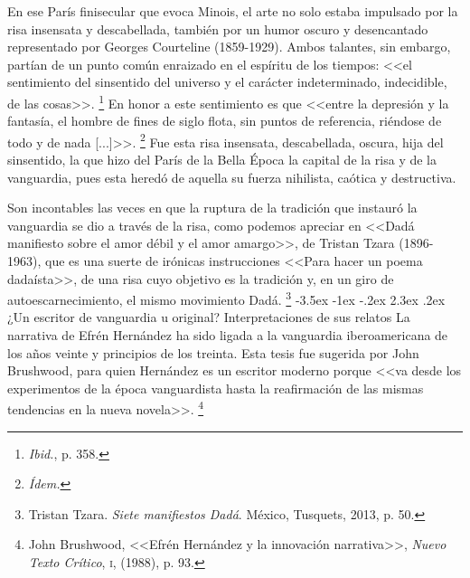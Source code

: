 \documentclass[14pt,twoside,final]{extbook} %
\makeatletter
\let\oldfootnote\footnote
\renewcommand\footnote[1]{%
\oldfootnote{\hspace{1mm}#1}}
\renewcommand\section{\@startsection {section}{1}{\z@}%
                                     {-3.5ex \@plus -1ex \@minus -.2ex}%
                                     {2.3ex \@plus .2ex}%
                                     {\normalfont\large\bfseries\sc}}
\makeatother
\begin{document}
En ese París finisecular que evoca Minois, el arte no solo estaba impulsado por la risa insensata y descabellada, también por un humor oscuro y desencantado representado por Georges Courteline (1859-1929). Ambos talantes, sin embargo, partían de un punto común enraizado en el espíritu de los tiempos: <<el sentimiento del sinsentido del universo y el carácter indeterminado, indecidible, de las cosas>>.\footnote{\emph{Ibid.}, p. 358.} En honor a este sentimiento es que <<entre la depresión y la fantasía, el hombre de fines de siglo flota, sin puntos de referencia, riéndose de todo y de nada [...]>>.\footnote{\emph{Ídem.}} Fue esta risa insensata, descabellada, oscura, hija del sinsentido, la que hizo del París de la Bella Época la capital de la risa y de la vanguardia, pues esta heredó de aquella su fuerza nihilista, caótica y destructiva.

Son incontables las veces en que la ruptura de la tradición que instauró la vanguardia se dio a través de la risa, como podemos apreciar en <<Dadá manifiesto sobre el amor débil y el amor amargo>>, de Tristan Tzara (\mbox{1896-1963}), que es una suerte de irónicas instrucciones <<Para hacer un poema dadaísta>>, de una risa cuyo objetivo es la tradición y, en un giro de autoescarnecimiento, el mismo movimiento Dadá.\footnote{Tristan Tzara. \emph{Siete manifiestos Dadá}. México, Tusquets, 2013, p. 50.}
\section{¿Un escritor de vanguardia u original? Interpretaciones de sus relatos}\label{sec:un-escritor-de-vanguardia-u-original-interprestaciones-de-sus-relatos}
La narrativa de Efrén Hernández ha sido ligada a la vanguardia iberoamericana de los años veinte y principios de los treinta. Esta tesis fue sugerida por John Brushwood, para quien Hernández es un escritor moderno porque <<va desde los experimentos de la época vanguardista hasta la reafirmación de las mismas tendencias en la nueva novela>>.\footnote{John Brushwood, <<Efrén Hernández y la innovación narrativa>>, \emph{Nuevo Texto Crítico}, \textsc{i}, (1988), p. 93.}
\end{document}
